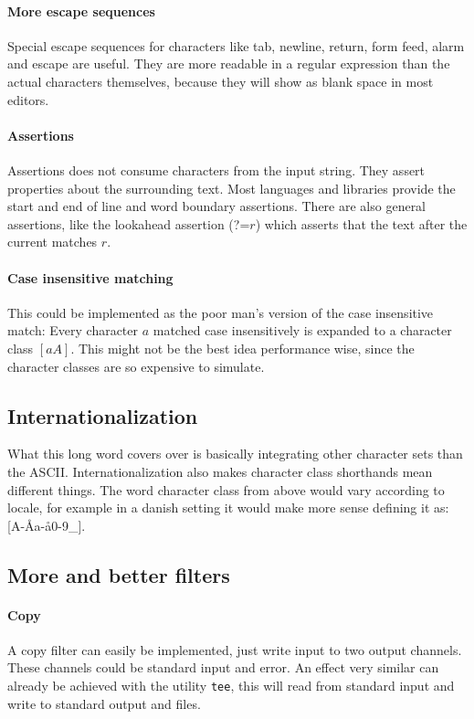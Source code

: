 \paragraph{More escape sequences} Special
escape sequences for characters like tab, newline, return, form feed,
alarm and escape are useful. They are more readable in a regular
expression than the actual characters themselves, because they will
show as blank space in most editors. 

\paragraph{Assertions} Assertions does not consume characters from the
input string. They assert properties about the surrounding text. Most
languages and libraries provide the start and end of line and word
boundary assertions. There are also general assertions, like the
lookahead assertion \textsf{(?=$r$)} which asserts that the text after
the current matches $r$.

\paragraph{Case insensitive matching} This could be implemented as the
poor man's version of the case insensitive match: Every character $a$
matched case insensitively is expanded to a character class
$[aA]$. This might not be the best idea performance wise, since the
character classes are so expensive to simulate.

\subsection{Internationalization}

What this long word covers over is basically integrating other
character sets than the ASCII. Internationalization also makes
character class shorthands mean different things. The word character
class from above would vary according to locale, for example in a
danish setting it would make more sense defining it as:
\textsf{[A-Åa-å0-9\_]}.


\subsection{More and better filters}

\paragraph{Copy} A copy filter can easily be implemented, just write
input to two output channels. These channels could be standard input
and error. An effect very similar can already be achieved with the
utility \texttt{tee}, this will read from standard input and write to
standard output and files.

